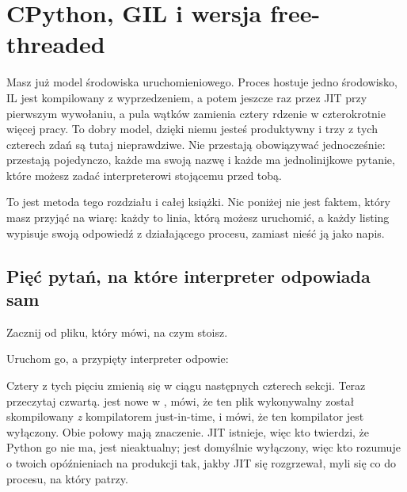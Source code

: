 
\chapter{CPython, GIL i wersja free-threaded}
\label{ch:runtime}

\noindent
Masz już model środowiska uruchomieniowego. Proces hostuje jedno środowisko,
IL jest kompilowany z wyprzedzeniem, a potem jeszcze raz przez JIT przy
pierwszym wywołaniu, a pula wątków zamienia cztery rdzenie w czterokrotnie
więcej pracy. To dobry model, dzięki niemu jesteś produktywny \dash{} i trzy
z tych czterech zdań są tutaj nieprawdziwe. Nie przestają obowiązywać
jednocześnie: przestają pojedynczo, każde ma swoją nazwę i każde ma
jednolinijkowe pytanie, które możesz zadać interpreterowi stojącemu przed
tobą.

To jest metoda tego rozdziału i całej książki. Nic poniżej nie jest faktem,
który masz przyjąć na wiarę: każdy to linia, którą możesz uruchomić, a każdy
listing wypisuje swoją odpowiedź z działającego procesu, zamiast nieść ją
jako napis.

\section{Pięć pytań, na które interpreter odpowiada sam}
\label{sec:ch01-questions}

\noindent
Zacznij od pliku, który mówi, na czym stoisz.


\noindent
Uruchom go, a przypięty interpreter odpowie:


\noindent
Cztery z tych pięciu zmienią się w ciągu następnych czterech sekcji. Teraz
przeczytaj czwartą.  jest nowe w \pyver{}, mówi, że ten plik
wykonywalny został skompilowany \emph{z} kompilatorem just-in-time, i mówi,
że ten kompilator jest wyłączony. Obie połowy mają znaczenie. JIT istnieje,
więc kto twierdzi, że Python go nie ma, jest nieaktualny; jest domyślnie
wyłączony, więc kto rozumuje o twoich opóźnieniach na produkcji tak, jakby
JIT się rozgrzewał, myli się co do procesu, na który patrzy.

